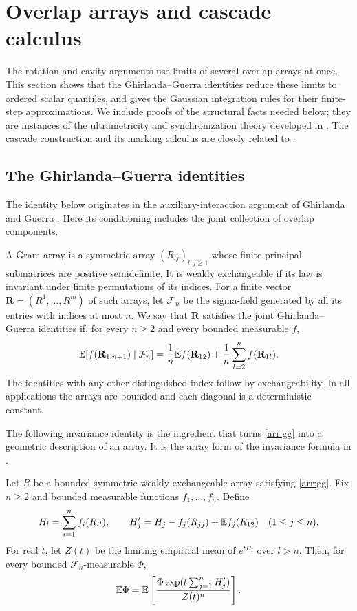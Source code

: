 \section{Overlap arrays and cascade calculus}\label{sec:arrays}

The rotation and cavity arguments use limits of several overlap arrays at
once. This section shows that the Ghirlanda--Guerra identities reduce these
limits to ordered scalar quantiles, and gives the Gaussian integration rules
for their finite-step approximations. We include proofs of the structural
facts needed below; they are instances of the ultrametricity and
synchronization theory developed in
\cite{PanchenkoUltra,PanchenkoMulti}. The cascade construction and its marking
calculus are closely related to \cite{BolthausenSznitman}.

\subsection{The Ghirlanda--Guerra identities}

The identity below originates in the auxiliary-interaction argument of
Ghirlanda and Guerra \cite[\S3, equation~(28)]{GhirlandaGuerra1998}.
Here its conditioning includes the joint collection of overlap components.

A Gram array is a symmetric array $(R_{lj})_{l,j\geq1}$ whose finite
principal submatrices are positive semidefinite. It is weakly exchangeable
if its law is invariant under finite permutations of its indices. For a
finite vector $\mathbf R=(R^1,\ldots,R^m)$ of such arrays, let
$\mathcal F_n$ be the sigma-field generated by all its entries with indices
at most $n$. We say that $\mathbf R$ satisfies the joint
Ghirlanda--Guerra identities if, for every $n\geq2$ and every bounded
measurable $f$,
\begin{equation}\label{arr:gg}
 \mathbb E[f(\mathbf R_{1,n+1})\mid\mathcal F_n]
 =\frac1n\mathbb E f(\mathbf R_{12})
   +\frac1n\sum_{l=2}^n f(\mathbf R_{1l}).
\end{equation}
The identities with any other distinguished index follow by
exchangeability. In all applications the arrays are bounded and each
diagonal is a deterministic constant.

The following invariance identity is the ingredient that turns
\eqref{arr:gg} into a geometric description of an array. It is the
array form of the invariance formula in
\cite[Theorem~2 in the cited arXiv version]{PanchenkoUltra}.

\begin{lemma}\label{arr:invariance}
Let $R$ be a bounded symmetric weakly exchangeable array satisfying
\eqref{arr:gg}. Fix $n\geq2$ and bounded measurable functions
$f_1,\ldots,f_n$. Define
\[
 H_l=\sum_{i=1}^n f_i(R_{il}),\qquad
 H'_j=H_j-f_j(R_{jj})+\mathbb E f_j(R_{12})\quad(1\leq j\leq n).
\]
For real $t$, let $Z(t)$ be the limiting empirical mean of $e^{tH_l}$
over $l>n$. Then, for every bounded $\mathcal F_n$-measurable $\Phi$,
\begin{equation}\label{arr:invariance-eq}
 \mathbb E\Phi
 =\mathbb E\left[
  \frac{\Phi\exp(t\sum_{j=1}^n H'_j)}{Z(t)^n}
 \right].
\end{equation}
\end{lemma}

